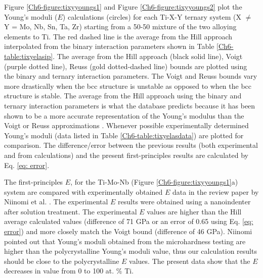 Figure \ref{Ch6-figure:tixyyoungs1} and Figure \ref{Ch6-figure:tixyyoungs2} plot the Young's moduli ($E$) calculations (circles) for each Ti-X-Y ternary system (X $\neq$ Y = Mo, Nb, Sn, Ta, Zr) starting from a 50-50 mixture of the two alloying elements to Ti. The red dashed line is the average from the Hill approach interpolated from the binary interaction parameters shown in Table \ref{Ch6-table:tixyelasip}. The average from the Hill approach (black solid line), Voigt (purple dotted line), Reuss (gold dotted-dashed line) bounds are plotted using the binary and ternary interaction parameters. The Voigt and Reuss bounds vary more drastically when the bcc structure is unstable as opposed to when the bcc structure is stable. The average  from the Hill approach using the binary and ternary interaction parameters is what the database predicts because it has been shown to be a more accurate representation of the Young's modulus than the Voigt or Reuss approximations \cite{Yue2009,Chung1967}. Whenever possible experimentally determined Young's moduli \cite{Niinomi2012,Mohammed2014,Nozoe2007,Geetha2009} (data listed in Table \ref{Ch6-table:tixyelasdata}) are plotted for comparison. The difference/error between the previous results (both experimental and from calculations) and the present first-principles results are calculated by Eq. \ref{eq: error}.

The first-principles $E$, for the Ti-Mo-Nb (Figure \ref{Ch6-figure:tixyyoungs1}a) system are compared with experimentally obtained $E$ data in the review paper by Niinomi et al. \cite{Niinomi2012}. The experimental $E$ results were obtained using a nanoindenter after solution treatment. The experimental $E$ values are higher than the Hill average calculated values (difference of 71 GPa or an error of 0.65 using Eq. \ref{eq: error}) and more closely match the Voigt bound (difference of 46 GPa). Niinomi \cite{Niinomi2012} pointed out that Young's moduli obtained from the microhardness testing are higher than the polycrystalline Young's moduli value, thus our calculation results should be close to the polycrystalline $E$ values. The present data show that the $E$ decreases in value from 0 to 100 at. \% Ti. 

